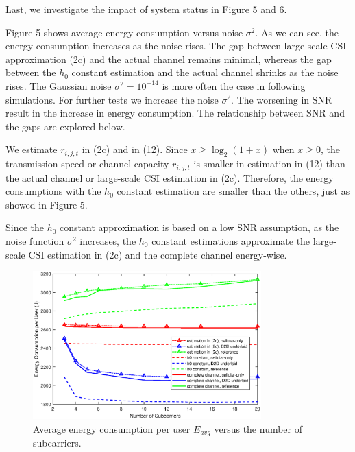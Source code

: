 \documentclass{ieeeaccess}
\begin{document}
Last, we investigate the impact of system status in Figure 5 and 6.

Figure 5 shows average energy consumption versus noise ${\sigma ^2}$. As we can see, the energy consumption increases as the noise rises. The gap between large-scale CSI approximation (2c) and the actual channel remains minimal, whereas the gap between the ${h_0}$ constant estimation and the actual channel shrinks as the noise rises. The Gaussian noise ${\sigma ^2 ={10^{ - 14}}}$ is more often the case in following simulations. For further tests we increase the noise ${\sigma ^2}$. The worsening in SNR result in the increase in energy consumption. The relationship between SNR and the gaps are explored below. 

We estimate ${r_{i,j,t}}$ in (2c) and in (12). Since $x \ge {\log _2}\left( {1 + x} \right)$ when ${x \ge 0}$, the transmission speed or channel capacity ${r_{i,j,t}}$ is smaller in estimation in (12) than the actual channel or large-scale CSI estimation in (2c). Therefore, the energy consumptions with the ${h_0}$ constant estimation are smaller than the others, just as showed in Figure 5. 

Since the ${h_0}$ constant approximation is based on a low SNR assumption, as the noise function ${\sigma ^2}$ increases, the ${h_0}$ constant estimations approximate the large-scale CSI estimation in (2c) and the complete channel energy-wise.






\begin{figure} [htb]
\includegraphics*[width=8.8cm]{Ns.eps}
\caption{Average energy consumption per user $E_{avg}$ versus the number of subcarriers.} \label{fig:6}
\end{figure}

\end{document}
